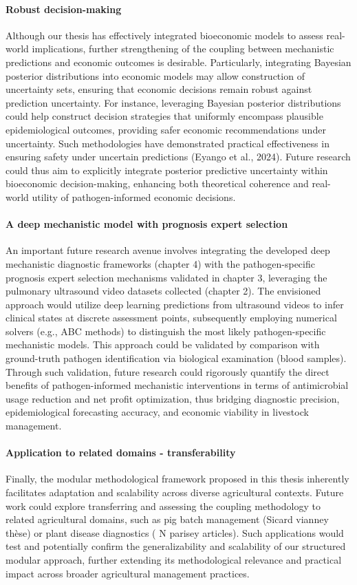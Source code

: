 \paragraph{Robust decision-making} Although our thesis has effectively integrated bioeconomic models to assess real-world implications, further strengthening of the coupling between mechanistic predictions and economic outcomes is desirable. Particularly, integrating Bayesian posterior distributions into economic models may allow construction of uncertainty sets, ensuring that economic decisions remain robust against prediction uncertainty. For instance, leveraging Bayesian posterior distributions could help construct decision strategies that uniformly encompass plausible epidemiological outcomes, providing safer economic recommendations under uncertainty. Such methodologies have demonstrated practical effectiveness in ensuring safety under uncertain predictions (Eyango et al., 2024). Future research could thus aim to explicitly integrate posterior predictive uncertainty within bioeconomic decision-making, enhancing both theoretical coherence and real-world utility of pathogen-informed economic decisions.

\paragraph{A deep mechanistic model with prognosis expert selection} An important future research avenue involves integrating the developed deep mechanistic diagnostic frameworks (chapter 4) with the pathogen-specific prognosis expert selection mechanisms validated in chapter 3, leveraging the pulmonary ultrasound video datasets collected (chapter 2). The envisioned approach would utilize deep learning predictions from ultrasound videos to infer clinical states at discrete assessment points, subsequently employing numerical solvers (e.g., ABC methods) to distinguish the most likely pathogen-specific mechanistic models. This approach could be validated by comparison with ground-truth pathogen identification via biological examination (blood samples). Through such validation, future research could rigorously quantify the direct benefits of pathogen-informed mechanistic interventions in terms of antimicrobial usage reduction and net profit optimization, thus bridging diagnostic precision, epidemiological forecasting accuracy, and economic viability in livestock management. 

\paragraph{Application to related domains - transferability} Finally, the modular methodological framework proposed in this thesis inherently facilitates adaptation and scalability across diverse agricultural contexts. Future work could explore transferring and assessing the coupling methodology to related agricultural domains, such as pig batch management (Sicard vianney thèse) or plant disease diagnostics ( N parisey articles). Such applications would test and potentially confirm the generalizability and scalability of our structured modular approach, further extending its methodological relevance and practical impact across broader agricultural management practices.


